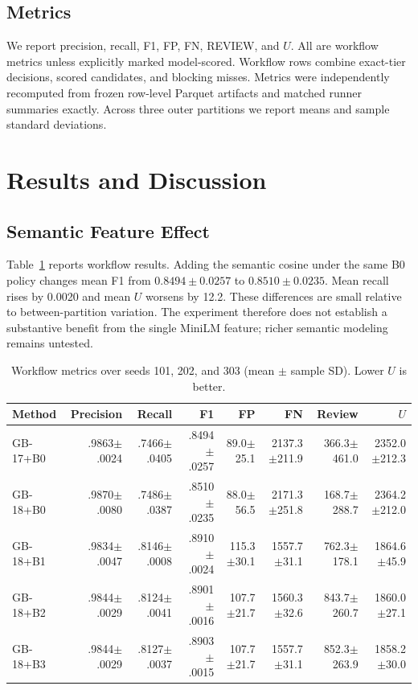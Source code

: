 \documentclass[conference]{IEEEtran}
\begin{document}
\subsection{Metrics}
We report precision, recall, F1, FP, FN, REVIEW, and $U$. All are workflow metrics unless explicitly marked model-scored. Workflow rows combine exact-tier decisions, scored candidates, and blocking misses. Metrics were independently recomputed from frozen row-level Parquet artifacts and matched runner summaries exactly. Across three outer partitions we report means and sample standard deviations.

\section{Results and Discussion}
\subsection{Semantic Feature Effect}
Table~\ref{tab:aggregate} reports workflow results. Adding the semantic cosine under the same B0 policy changes mean F1 from $0.8494\pm0.0257$ to $0.8510\pm0.0235$. Mean recall rises by 0.0020 and mean $U$ worsens by 12.2. These differences are small relative to between-partition variation. The experiment therefore does not establish a substantive benefit from the single MiniLM feature; richer semantic modeling remains untested.

\begin{table}[t]
\caption{Workflow metrics over seeds 101, 202, and 303 (mean $\pm$ sample SD). Lower $U$ is better.}
\label{tab:aggregate}
\centering
\begin{tabular}{lrrrrrrr}
\toprule
Method & Precision & Recall & F1 & FP & FN & Review & $U$\\
\midrule
GB-17+B0 & .9863$\pm$.0024 & .7466$\pm$.0405 & .8494$\pm$.0257 & 89.0$\pm$25.1 & 2137.3$\pm$211.9 & 366.3$\pm$461.0 & 2352.0$\pm$212.3\\
GB-18+B0 & .9870$\pm$.0080 & .7486$\pm$.0387 & .8510$\pm$.0235 & 88.0$\pm$56.5 & 2171.3$\pm$251.8 & 168.7$\pm$288.7 & 2364.2$\pm$212.0\\
GB-18+B1 & .9834$\pm$.0047 & .8146$\pm$.0008 & .8910$\pm$.0024 & 115.3$\pm$30.1 & 1557.7$\pm$31.1 & 762.3$\pm$178.1 & 1864.6$\pm$45.9\\
GB-18+B2 & .9844$\pm$.0029 & .8124$\pm$.0041 & .8901$\pm$.0016 & 107.7$\pm$21.7 & 1560.3$\pm$32.6 & 843.7$\pm$260.7 & 1860.0$\pm$27.1\\
GB-18+B3 & .9844$\pm$.0029 & .8127$\pm$.0037 & .8903$\pm$.0015 & 107.7$\pm$21.7 & 1557.7$\pm$31.1 & 852.3$\pm$263.9 & 1858.2$\pm$30.0\\
\bottomrule
\end{tabular}
\end{table}
\end{document}
